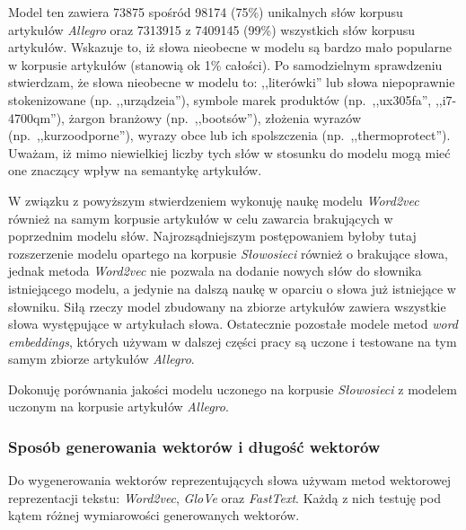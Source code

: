 \documentclass[pl]{minipw} %
\begin{document}
Model ten zawiera 73875 spośród 98174 (75\%) unikalnych słów korpusu artykułów \textit{Allegro} oraz 7313915 z 7409145 (99\%) wszystkich słów korpusu artykułów. Wskazuje to, iż słowa nieobecne w modelu są bardzo mało popularne w korpusie artykułów (stanowią ok 1\% całości). Po samodzielnym sprawdzeniu stwierdzam, że słowa nieobecne w modelu to: ,,literówki'' lub słowa niepoprawnie stokenizowane (np. ,,urządzeia''), symbole marek produktów (np.~,,ux305fa'', ,,i7-4700qm''), żargon branżowy (np.~,,bootsów''), złożenia wyrazów (np.~,,kurzoodporne''), wyrazy obce lub ich spolszczenia (np.~,,thermoprotect''). Uważam, iż mimo niewielkiej liczby tych słów w stosunku do modelu mogą mieć one znaczący wpływ na semantykę artykułów.

W związku z powyższym stwierdzeniem wykonuję naukę modelu \textit{Word2vec} również na samym korpusie artykułów w celu zawarcia brakujących w poprzednim modelu słów. Najrozsądniejszym postępowaniem byłoby tutaj rozszerzenie modelu opartego na korpusie \textit{Słowosieci} również o brakujące słowa, jednak metoda \textit{Word2vec} nie pozwala na dodanie nowych słów do słownika istniejącego modelu, a jedynie na dalszą naukę w oparciu o słowa już istniejące w słowniku. Siłą rzeczy model zbudowany na zbiorze artykułów zawiera wszystkie słowa występujące w artykułach słowa. Ostatecznie pozostałe modele metod \textit{word embeddings}, których używam w dalszej części pracy są uczone i testowane na tym samym zbiorze artykułów \textit{Allegro}.

Dokonuję porównania jakości modelu uczonego na korpusie \textit{Słowosieci} z modelem uczonym na korpusie artykułów \textit{Allegro}.

\subsubsection{Sposób generowania wektorów i długość wektorów}
Do wygenerowania wektorów reprezentujących słowa używam metod wektorowej reprezentacji tekstu: \textit{Word2vec}, \textit{GloVe} oraz \textit{FastText}. Każdą z nich testuję pod kątem różnej wymiarowości generowanych wektorów.
\end{document}

